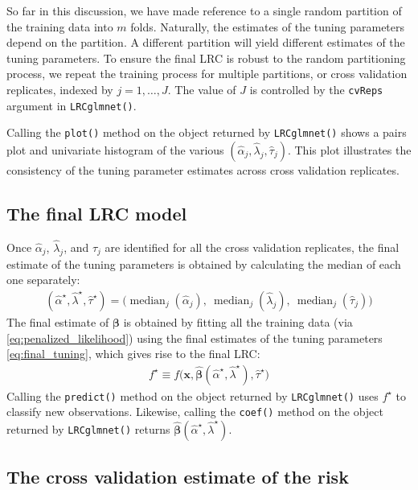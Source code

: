 \documentclass{article}
\DeclareMathOperator*{\median}{median}
\begin{document}
So far in this discussion, we have made reference to a single random partition of the training data into $m$ folds. 
Naturally, the estimates of the tuning parameters depend on the partition. A different partition will yield different
estimates of the tuning parameters.  To ensure the final LRC is robust to the random 
partitioning process, we repeat the training process for multiple partitions, or cross validation replicates, 
indexed by $j = 1,\ldots,J$.  The value of $J$ is controlled by the {\tt cvReps} argument in {\tt LRCglmnet()}.

Calling the {\tt plot()} method
on the object returned by {\tt LRCglmnet()} shows a pairs plot and univariate histogram of the
various $(\hat\alpha_j, \hat\lambda_j, \hat\tau_j)$.  This plot illustrates the consistency of the tuning parameter estimates 
across cross validation replicates.

\subsection{The final LRC model}

Once $\hat\alpha_j$, $\hat\lambda_j$, and $\hat\tau_j$ are identified for all the cross validation replicates, 
the final estimate of the tuning parameters is obtained by calculating the median of each one separately:
\begin{align}
\label{eq:final_tuning}
(\hat\alpha^\star,\hat\lambda^\star,\hat\tau^\star) = \bigl(\median_j(\hat\alpha_j), ~\median_j(\hat\lambda_j),
  ~\median_j(\hat\tau_j) \bigr)
\end{align}
\noindent The final estimate of $\boldsymbol\beta$ is obtained by fitting all the training 
data (via \eqref{eq:penalized_likelihood}) using the final estimates of the tuning parameters \eqref{eq:final_tuning}, 
which gives rise to the final LRC:
\begin{align}
f^\star \equiv f \bigl(\mathbf{x},\hat{\boldsymbol{\beta}}(\hat\alpha^\star,\hat\lambda^\star), \hat\tau^\star \bigr)
\end{align}
\noindent Calling the {\tt predict()} method on the object returned by {\tt LRCglmnet()} uses $f^\star$ to classify
new observations.  Likewise, calling the {\tt coef()} method on the object returned by {\tt LRCglmnet()} returns 
$\hat{\boldsymbol\beta}(\hat\alpha^\star,\hat\lambda^\star)$.

\subsection{The cross validation estimate of the risk}
\end{document}
